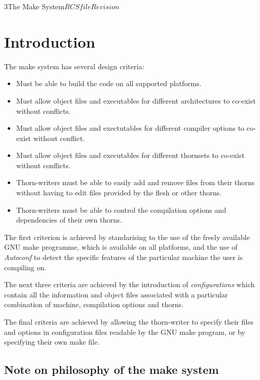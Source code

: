 %   

\begin{cactuspart}{3}{The Make System}{$RCSfile$}{$Revision$}
\renewcommand{\thepage}{\Alph{part}\arabic{page}}

\chapter{Introduction}

The make system has several design criteria:

\begin{itemize}
\item
Must be able to build the code on all supported platforms.
\item
Must allow object files and executables for different architectures to 
co-exist without conflicts.
\item{}
Must allow object files and exectutables for different compiler options to
co-exist without conflict.
\item{}
Must allow object files and executables for different thornsets to 
co-exist without conflicts.
\item{}
Thorn-writers must be able to easily add and remove files from their
thorns without having to edit files provided by the flesh or other thorns.
\item{}
Thorn-writers must be able to control the compilation options and 
dependencies of their own thorns.
\end{itemize}

The first criterion is achieved by standarising to the use of the freely
available GNU make programme, which is available on all platforms, and
the use of {\em Autoconf} to detect the specific features of the particular
machine the user is compiling on.

The next three criteria are achieved by the introduction of {\em configurations}
which contain all the information and object files associated with a 
particular combination of machine, compilation options and thorns.

The final criteria are achieved by allowing the thorn-writer to specify their
files and options in configuration files readable by the GNU make program,
or by specifying their own make file.

\section{Note on philosophy of the make system}


\end{cactuspart}
